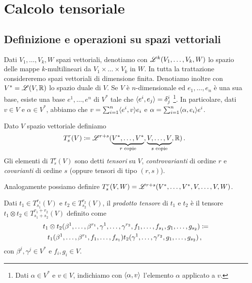 \chapter{Calcolo tensoriale} %

\section{Definizione e operazioni su spazi vettoriali}
Dati $V_1,\ldots,V_k,W$ spazi vettoriali, denotiamo con $\mathscr L^k(V_1,\ldots,V_k,W)$ lo spazio delle mappe $k$-multilineari da $V_1\times\ldots\times V_k$ in $W$. In tutta la trattazione considereremo spazi vettoriali di dimensione finita.
Denotiamo inoltre con $V^* = \mathscr L(V,\mathbb R)$ lo spazio duale di $V$.
Se $V$ è $n$-dimensionale ed $e_1,\ldots,e_n$ è una sua base, esiste una base $e^1,\ldots,e^n$ di $V^*$ tale che $\langle e^i , e_j \rangle = \delta^i_j$ \footnote{Dati $\alpha \in V^*$ e $v\in V$, indichiamo con $\langle \alpha , v \rangle$ l'elemento $\alpha$ applicato a $v$.}.
In particolare, dati $v\in V$ e $\alpha \in V^*$, abbiamo che $v= \sum_{i=1}^n \langle e^i , v \rangle e_i$ e $\alpha= \sum_{i=1}^n \langle \alpha , e_i \rangle e^i$.

\begin{definition}   
	Dato $V$ spazio vettoriale definiamo 
	\begin{equation*}
	T_s^r(V) \coloneqq \mathscr L^{r+s} (\underbrace{V^*,\ldots,V^*}_{\text{$r$ copie}},\underbrace{V,\ldots,V}_{\text{$s$ copie}},\mathbb R) \, \text{. }
	\end{equation*}
	Gli elementi di $T_s^r(V)$ sono detti \emph{tensori} su $V$, \emph{controvarianti} di ordine $r$ e \emph{covarianti} di ordine $s$ (oppure tensori di tipo $(r,s)$).
\end{definition}

\begin{remark}
	Analogamente possiamo definire $T_s^r(V,W) = \mathscr L^{r+s} (V^*,\ldots,V^*,V,\ldots,V,W)$.
\end{remark}


\begin{definition} 
	Dati $t_1\in T_{s_1}^{r_1}(V)$ e $t_2\in T_{s_2}^{r_2}(V)$, il \emph{prodotto tensore} di $t_1$ e $t_2$ è il tensore $t_1\otimes t_2 \in T_{s_1+s_2}^{r_1+r_2}(V)$ definito come 
	\begin{multline*}
		t_1\otimes t_2(\beta^1,\ldots,\beta^{r_1},\gamma^1,\ldots,\gamma^{r_2}, f_1,\ldots,f_{s_1},g_1,\ldots,g_{s_2}) \coloneqq\\
		t_1(\beta^1,\ldots,\beta^{r_1},f_1,\ldots,f_{s_1})t_2(\gamma^1,\ldots,\gamma^{r_2},g_1,\ldots,g_{s_2}) \, \text{, }
	\end{multline*}
	con $\beta^j,\gamma^j\in V^*$ e $f_i,g_i\in V$.
\end{definition}


